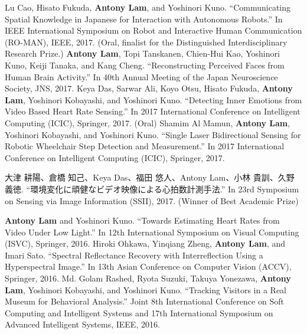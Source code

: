 \documentclass[letterpaper,10pt]{article}
\begin{document}
Lu Cao, Hisato Fukuda, \textbf{Antony Lam}, and Yoshinori Kuno. ``Communicating Spatial Knowledge in Japanese for Interaction with Autonomous Robots.'' In IEEE International Symposium on Robot and Interactive Human Communication (RO-MAN), IEEE,
2017. (Oral, finalist for the Distinguished Interdisciplinary Research Prize.)\vspace{0.05in}\newline
\textbf{Antony Lam}, Topi Tanskanen, Chien-Hui Kao, Yoshinori Kuno, Keiji Tanaka, and Kang Cheng. ``Reconstructing Perceived Faces from Human Brain Activity.'' In 40th Annual Meeting of the Japan Neuroscience Society, JNS, 2017.\vspace{0.05in}\newline
Keya Das, Sarwar Ali, Koyo Otsu, Hisato Fukuda,\textbf{ Antony Lam}, Yoshinori Kobayashi, and Yoshinori Kuno. ``Detecting Inner Emotions from Video Based Heart Rate Sensing.'' In 2017 International Conference on Intelligent Computing (ICIC), Springer, 2017. (Oral) \vspace{0.05in}\newline
Shamim Al Mamun, \textbf{Antony Lam}, Yoshinori Kobayashi, and Yoshinori Kuno. ``Single Laser Bidirectional Sensing for Robotic Wheelchair Step Detection and Measurement.'' In 2017 International Conference on Intelligent Computing (ICIC), Springer, 2017. \vspace{0.05in}\newline
\begin{CJK}{UTF8}{min}大津 耕陽、倉橋 知己、Keya Das、福田 悠人、Antony Lam、小林 貴訓、久野 義徳. ``環境変化に頑健なビデオ映像による心拍数計測手法.'' In 23rd Symposium on Sensing via Image Information (SSII), 2017. (Winner of Best Academic Prize)\end{CJK}\vspace{0.05in}\newline
\textbf{Antony Lam} and Yoshinori Kuno. ``Towards Estimating Heart Rates from Video Under Low Light.'' In 12th International Symposium on Visual Computing (ISVC), Springer, 2016. \vspace{0.05in}\newline
Hiroki Ohkawa, Yinqiang Zheng, \textbf{Antony Lam}, and Imari Sato. ``Spectral Reflectance Recovery with Interreflection Using a Hyperspectral Image.'' In 13th Asian Conference on Computer Vision (ACCV), Springer, 2016. \vspace{0.05in}\newline
Md. Golam Rashed, Ryota Suzuki, Takuya Yonezawa, \textbf{Antony Lam}, Yoshinori Kobayashi, and Yoshinori Kuno. ``Tracking Visitors in a Real Museum for Behavioral Analysis.''  Joint 8th International Conference on Soft Computing and Intelligent Systems and 17th International Symposium on Advanced Intelligent Systems, IEEE, 2016.  \vspace{0.05in}\newline
\end{document}
